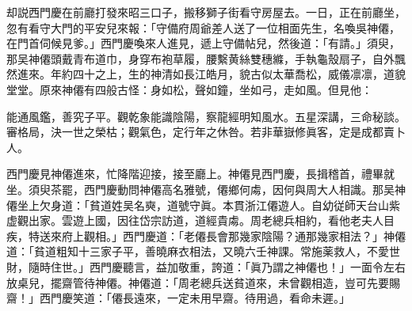 却説西門慶在前廳打發來昭三口子，搬移獅子街看守房屋去。一日，正在前廳坐，忽有看守大門的平安兒來報：「守備府周爺差人送了一位相面先生，名喚吳神僊，在門首伺候見爹。」西門慶喚來人進見，遞上守備帖兒，然後道：「有請。」須臾，那吴神僊頭戴青布道巾，身穿布袍草履，腰繫黄絲雙穗縧，手執龜殼扇子，自外飄然進來。年約四十之上，生的神清如長江皓月，貌古似太華喬松，威儀凛凛，道貌堂堂。原來神僊有四般古怪：身如松，聲如鐘，坐如弓，走如風。但見他：

能通風鑑，善究子平。觀乾象能識陰陽，察龍經明知風水。五星深講，三命秘談。審格局，決一世之榮枯；觀氣色，定行年之休咎。若非華嶽修眞客，定是成都賣卜人。

西門慶見神僊進來，忙降階迎接，接至廳上。神僊見西門慶，長揖稽首，禮畢就坐。須臾茶罷，西門慶動問神僊高名雅號，僊鄉何䖏，因何與周大人相識。那吴神僊坐上欠身道：「貧道姓吴名奭，道號守眞。本貫浙江僊遊人。自幼従師天台山紫虚觀出家。雲遊上國，因往岱宗訪道，道經貴䖏。周老總兵相約，看他老夫人目疾，特送來府上觀相。」西門慶道：「老僊長會那幾家陰陽？通那幾家相法？」神僊道：「貧道粗知十三家子平，善曉麻衣相法，又曉六壬神課。常施薬救人，不愛世財，隨時住世。」西門慶聽言，益加敬重，誇道：「眞乃謂之神僊也！」一面令左右放桌兒，擺齋管待神僊。神僊道：「周老總兵送貧道來，未曾觀相造，豈可先要賜齋！」西門慶笑道：「僊長遠來，一定未用早齋。待用過，看命未遲。」

